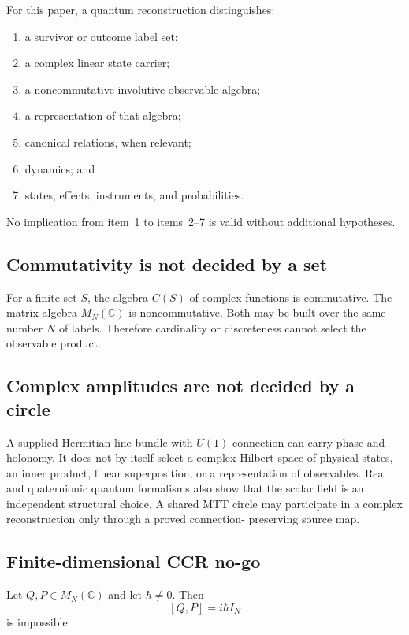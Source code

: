 \documentclass[11pt]{article}
\begin{document}
For this paper, a quantum reconstruction distinguishes:
\begin{enumerate}
\item a survivor or outcome label set;
\item a complex linear state carrier;
\item a noncommutative involutive observable algebra;
\item a representation of that algebra;
\item canonical relations, when relevant;
\item dynamics; and
\item states, effects, instruments, and probabilities.
\end{enumerate}

No implication from item~1 to items~2--7 is valid without additional
hypotheses.

\subsection{Commutativity is not decided by a set}

For a finite set $S$, the algebra $C(S)$ of complex functions is commutative.
The matrix algebra $M_N(\mathbb C)$ is noncommutative.  Both may be built over
the same number $N$ of labels.  Therefore cardinality or discreteness cannot
select the observable product.

\subsection{Complex amplitudes are not decided by a circle}

A supplied Hermitian line bundle with $U(1)$ connection can carry phase and
holonomy.  It does not by itself select a complex Hilbert space of physical
states, an inner product, linear superposition, or a representation of
observables.  Real and quaternionic quantum formalisms also show that the
scalar field is an independent structural choice.  A shared MTT circle may
participate in a complex reconstruction only through a proved connection-
preserving source map.

\subsection{Finite-dimensional CCR no-go}

\begin{theorem}
\label{thm:ccr-no-go}
Let $Q,P\in M_N(\mathbb C)$ and let $\hbar\ne0$.  Then
\[
 [Q,P]=i\hbar I_N
\]
is impossible.
\end{theorem}
\end{document}
